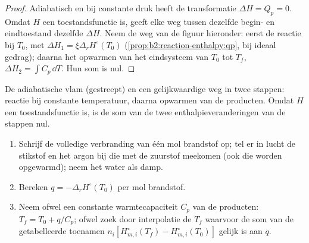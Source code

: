 \begin{proof}
Adiabatisch en bij constante druk heeft de transformatie $\Delta H =
Q_p = 0$. Omdat $H$ een toestandsfunctie is, geeft elke weg tussen dezelfde begin- en
eindtoestand dezelfde $\Delta H$. Neem de weg van
de figuur hieronder: eerst de reactie bij $T_0$, met
$\Delta H_1 = \xi\Delta_r H^\circ(T_0)$ (\cref{prop:b2:reaction-enthalpy:qp},
bij ideaal gedrag); daarna het opwarmen van het eindsysteem van $T_0$ tot
$T_f$, $\Delta H_2 = \int C_p\,\dd T$. Hun som is nul.
\end{proof}

\begin{omfigure}

{\small De adiabatische vlam (gestreept) en een gelijkwaardige weg in twee
stappen: reactie bij constante temperatuur, daarna opwarmen van de producten.
Omdat $H$ een toestandsfunctie is, is de som van de twee enthalpieveranderingen van de stappen
nul.}
\end{omfigure}

\begin{method}[Vlamtemperatuur]\label{met:b2:reaction-enthalpy:flame-temperature}
\begin{enumerate}
  \item Schrijf de volledige verbranding van één mol brandstof op; tel er in lucht
        de stikstof en het argon bij die met de zuurstof meekomen (ook die worden
        opgewarmd); neem het water als damp.
  \item Bereken $q = -\Delta_r H^\circ(T_0)$ per mol brandstof.
  \item Neem ofwel een constante warmtecapaciteit $C_p$ van de producten:
        $T_f = T_0 + q/C_p$; ofwel zoek door interpolatie de $T_f$ waarvoor de som van de
        getabelleerde toenamen $n_i[H^\circ_{m,i}(T_f) - H^\circ_{m,i}(T_0)]$
        gelijk is aan $q$.
\end{enumerate}
\end{method}

